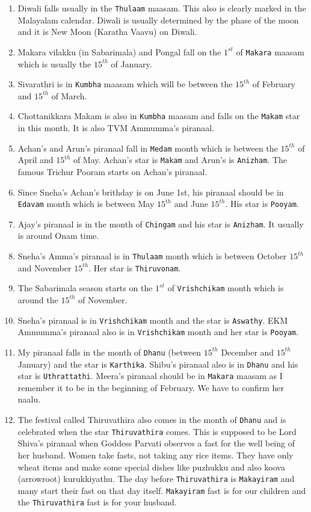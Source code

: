 \documentclass[10pt,twoside]{article}
\begin{document}
\begin{enumerate}
\item Diwali falls usually in the \verb|Thulaam| maasam. This also is clearly marked in the Malayalam calendar. Diwali is usually determined by the phase of the moon and it is New Moon (Karatha Vaavu) on Diwali.
\item Makara vilakku (in Sabarimala) and Pongal fall on the $1^{st}$ of \verb|Makara| maasam which is usually the $15^{th}$ of January.
\item Sivarathri is in \verb|Kumbha| maasam which will be between the $15^{th}$ of February and $15^{th}$ of March.
\item Chottanikkara Makam is also in \verb|Kumbha| maasam and falls on the \verb|Makam| star in this month. It is also TVM Ammumma's piranaal.
\item Achan's and Arun's piranaal fall in \verb|Medam| month which is between the $15^{th}$ of April and $15^{th}$ of May. Achan's star is \verb|Makam| and Arun's is \verb|Anizham|. The famous Trichur Pooram starts on Achan's piranaal.
\item Since Sneha's Achan's brithday is on June 1st, his piranaal should be in \verb|Edavam| month which is between May $15^{th}$ and June $15^{th}$. His star is \verb|Pooyam|.
\item Ajay's piranaal is in the month of \verb|Chingam| and his star is \verb|Anizham|. It usually is around Onam time. 
\item Sneha's Amma's piranaal is in \verb|Thulaam| month which is between October $15^{th}$ and November $15^{th}$. Her star is \verb|Thiruvonam|.
\item The Sabarimala season starts on the $1^{st}$ of \verb|Vrishchikam| month which is around the $15^{th}$ of November.
\item Sneha's piranaal is in \verb|Vrishchikam| month and the star is \verb|Aswathy|. EKM Ammumma's piranaal also is in \verb|Vrishchikam| month and her star is \verb|Pooyam|.
\item My piranaal falls in the month of \verb|Dhanu| (between $15^{th}$ December and $15^{th}$ January) and the star is \verb|Karthika|. Shibu's piranaal also is in \verb|Dhanu| and his star is \verb|Uthrattathi|. Meera's piranaal should be in \verb|Makara| maasam as I remember it to be in the beginning of February. We have to confirm her naalu.
\item The festival called Thiruvathira also comes in the month of \verb|Dhanu| and is celebrated when the star \verb|Thiruvathira| comes. This is supposed to be Lord Shiva's piranaal when Goddess Parvati observes a fast for the well being of her husband. Women take fasts, not taking any rice items. They have only wheat items and make some special dishes like puzhukku and also koova (arrowroot) kurukkiyathu. The day before \verb|Thiruvathira| is \verb|Makayiram| and many start their fast on that day itself. \verb|Makayiram| fast is for our children and the \verb|Thiruvathira| fast is for your husband.
\end{enumerate}
\end{document}
